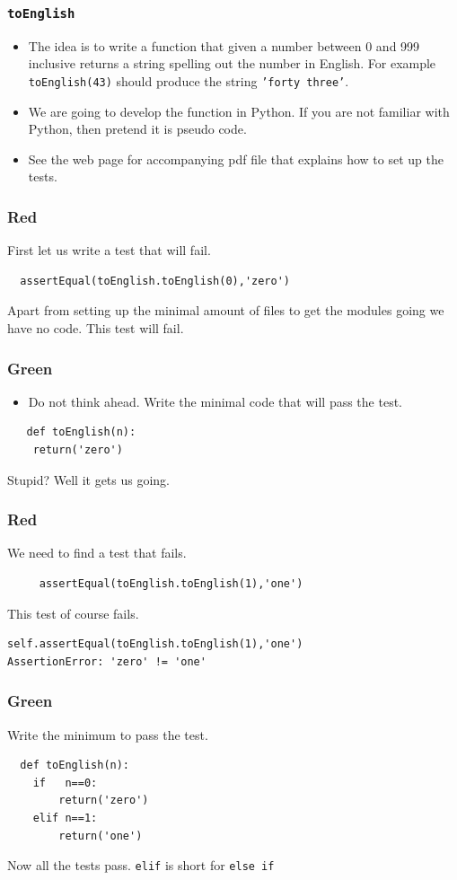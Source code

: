 \documentclass{beamer}
\begin{document}
\begin{frame}
  \frametitle{{\tt toEnglish}}

  \begin{itemize}
  \item  The idea is to write a function that given a number between 0 and 999
inclusive returns a string spelling out the number in English. For
example {\tt toEnglish(43)} should produce the string {\tt 'forty
  three'}. 
\item We are going to develop the function in Python. If you are
not familiar with Python, then  pretend it is pseudo code.
\item See the web page for accompanying pdf file that explains how to
  set up the tests. 
  \end{itemize}
\end{frame}
\begin{frame}[fragile]
  \frametitle{Red}
  First let us  write a test that will fail.
  \color{red}
\begin{lstlisting}
  assertEqual(toEnglish.toEnglish(0),'zero')
\end{lstlisting}
\color{black}
Apart from setting up the minimal amount of files to get the modules
going we have no code. This test will fail.
\end{frame}
\begin{frame}[fragile]
  \frametitle{Green}
  \begin{itemize}
  \item Do not think ahead. Write the minimal code that will pass the test.
  \end{itemize}
  \begin{lstlisting}
   def toEnglish(n):
    return('zero')
  \end{lstlisting}
Stupid? Well it gets us going.
\end{frame}
\begin{frame}[fragile]
\frametitle{Red}
We need to find a test that fails.
\color{red}
\begin{lstlisting}
     assertEqual(toEnglish.toEnglish(1),'one')
   \end{lstlisting}
\color{black}
This test of course fails.
\begin{verbatim}
self.assertEqual(toEnglish.toEnglish(1),'one')
AssertionError: 'zero' != 'one'
\end{verbatim}
\end{frame}
\begin{frame}[fragile]
  \frametitle{Green}
Write the minimum to pass the test.
\begin{lstlisting}
  def toEnglish(n):
    if   n==0:
        return('zero')
    elif n==1:
        return('one')
\end{lstlisting}
Now all the tests pass. {\tt elif} is short for {\tt else if}
\end{frame}
\end{document}
